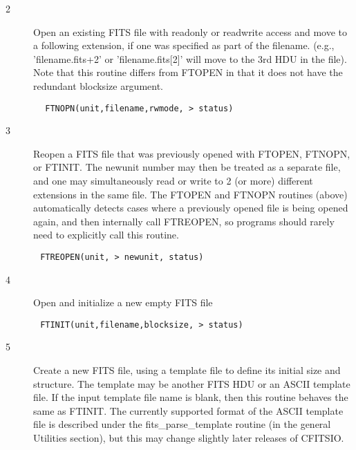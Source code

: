 \documentclass[11pt]{book}
\begin{document}
\begin{description}
\item[2 ]Open an existing FITS file with readonly or readwrite access
   and move to a following extension, if one was specified as
   part of the filename.  (e.g.,  'filename.fits+2' or
   'filename.fits[2]' will move to the 3rd HDU in the file).
   Note that this routine differs from FTOPEN in that it does not
  have the redundant blocksize argument.
\end{description}

\begin{verbatim}
        FTNOPN(unit,filename,rwmode, > status)
\end{verbatim}

\begin{description}
\item[3 ] Reopen a FITS file that was previously opened with
    FTOPEN, FTNOPN, or FTINIT.  The newunit number
    may then be treated as a separate file, and one may
    simultaneously read or write to 2 (or more)  different extensions in
    the same file.   The FTOPEN and FTNOPN routines (above) automatically
    detects cases where a previously opened file is being opened again,
    and then internally call FTREOPEN, so programs should rarely
   need to explicitly call this routine.
\end{description}

\begin{verbatim}
       FTREOPEN(unit, > newunit, status)
\end{verbatim}

\begin{description}
\item[4 ]Open and initialize a new empty FITS file
\end{description}

\begin{verbatim}
       FTINIT(unit,filename,blocksize, > status)
\end{verbatim}

\begin{description}
\item[5 ]  Create a new FITS file, using a template file to define its
  initial size and structure.  The template may be another FITS HDU
  or an ASCII template file.  If the input template file name
  is blank, then this routine behaves the same as FTINIT.
  The currently supported format of the ASCII template file is described
  under the fits\_parse\_template routine (in the general Utilities
  section), but this may change slightly later releases of
 CFITSIO.
\end{description}
\end{document}
